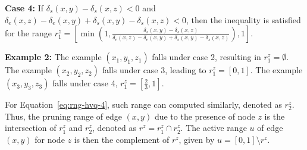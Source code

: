 \noindent\textbf{Case 4:} If $\delta_s(x,y) - \delta_s(x,z) < 0$ and $\delta_e(x,z) - \delta_e(x,y) + \delta_s(x,y) - \delta_s(x,z) < 0$, then the inequality is satisfied for the range $r_1^z = \left[\min\left(1, \frac{\delta_s(x,y) - \delta_s(x,z)}{\delta_e(x,z) - \delta_e(x,y) + \delta_s(x,y) - \delta_s(x,z)}\right), 1\right]$.


\noindent\textbf{Example 2:} The example $(x_1, y_1, z_1)$ falls under case 2, resulting in $r_1^z = \emptyset$. The example $(x_2, y_2, z_2)$ falls under case 3, leading to $r_1^z = [0, 1]$. The example $(x_3, y_3, z_3)$ falls under case 4, $r_1^z = [\frac{2}{3}, 1]$. %

For Equation~\ref{eq:rng-hvq-4}, such range can computed similarly, denoted as $r_2^z$. %
Thus, the pruning range of edge $(x, y)$ due to the presence of node $z$ is the intersection of $r_1^z$ and $r_2^z$, denoted as $r^z = r_1^z \cap r_2^z$. The active range $u$ of edge $(x, y)$ for node $z$ is then the complement of $r^z$, given by $u = [0, 1] \setminus r^z$.







